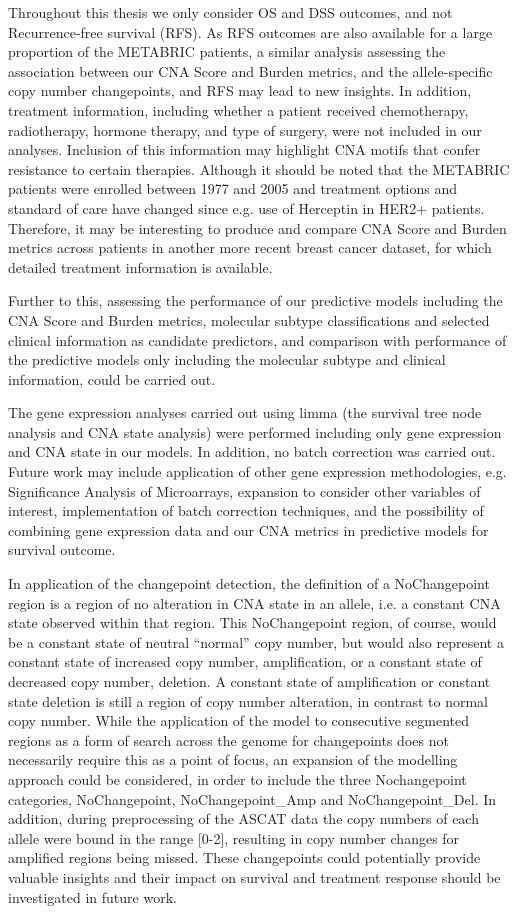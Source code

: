 Throughout this thesis we only consider OS and DSS outcomes, and not Recurrence-free survival (RFS). As RFS outcomes are also available for a large proportion of the METABRIC patients, a similar analysis assessing the association between our CNA Score and Burden metrics, and the allele-specific copy number changepoints, and RFS may lead to new insights. In addition, treatment information, including whether a patient received chemotherapy, radiotherapy, hormone therapy, and type of surgery, were not included in our analyses. Inclusion of this information may highlight CNA motifs that confer resistance to certain therapies. Although it should be noted that the METABRIC patients were enrolled between 1977 and 2005 and treatment options and standard of care have changed since e.g. use of Herceptin in HER2+ patients. Therefore, it may be interesting to produce and compare CNA Score and Burden metrics across patients in another more recent breast cancer dataset, for which detailed treatment information is available.

Further to this, assessing the performance of our predictive models including the CNA Score and Burden metrics, molecular subtype classifications and selected clinical information as candidate predictors, and comparison with performance of the predictive models only including the molecular subtype and clinical information, could be carried out. 

The gene expression analyses carried out using limma (the survival tree node analysis and CNA state analysis) were performed including only gene expression and CNA state in our models. In addition, no batch correction was carried out. Future work may include application of other gene expression methodologies, e.g. Significance Analysis of Microarrays, expansion to consider other variables of interest, implementation of batch correction techniques, and the possibility of combining gene expression data and our CNA metrics in predictive models for survival outcome.     

In application of the changepoint detection, the definition of a NoChangepoint region is a region of no alteration in CNA state in an allele, i.e. a constant CNA state observed within that region. This NoChangepoint region, of course, would be a constant state of neutral “normal” copy number, but would also represent a constant state of increased copy number, amplification, or a constant state of decreased copy number, deletion. A constant state of amplification or constant state deletion is still a region of copy number alteration, in contrast to normal copy number. While the application of the model to consecutive segmented regions as a form of search across the genome for changepoints does not necessarily require this as a point of focus, an expansion of the modelling approach could be considered, in order to include the three Nochangepoint categories, NoChangepoint, NoChangepoint\_Amp and NoChangepoint\_Del. In addition, during preprocessing of the ASCAT data the copy numbers of each allele were bound in the range [0-2], resulting in copy number changes for amplified regions being missed. These changepoints could potentially provide valuable insights and their impact on survival and treatment response should be investigated in future work. 

